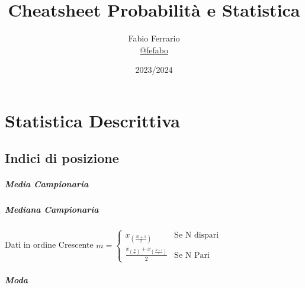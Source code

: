 \documentclass[12pt, a4paper, openany]{book}
\begin{document}
\title{Cheatsheet Probabilità e Statistica}

\author{
	Fabio Ferrario\\
	\small{\href{https://t.me/fefabo}{@fefabo}}
}

\date{2023/2024}

\maketitle

\tableofcontents

\chapter{Statistica Descrittiva}
\section{Indici di posizione}
\paragraph*{Media Campionaria}
\paragraph*{Mediana Campionaria}
Dati in ordine Crescente
{
    $m = 
    \begin{cases}
         x_{(\frac{N+1}{2})} & \text{Se N dispari}\\
         \frac{x_{(\frac{N}{2})} + x_{(\frac{N+1}{2})}}{2}  & \text{Se N Pari}
    \end{cases}$
}
\paragraph*{Moda}
\end{document}
